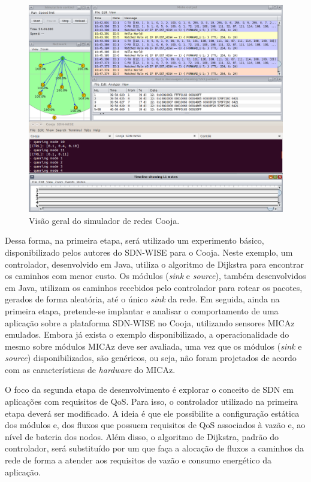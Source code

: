 \begin{figure}[!htb]
    \centering
    \includegraphics[width=15cm]{figs/simuladorCooja.png}
    \caption{Visão geral do simulador de redes Cooja.}
    \label{simuladorCooja}
\end{figure}

Dessa forma, na primeira etapa, será utilizado um experimento básico, disponibilizado pelos autores do \ac{SDN-WISE} para o Cooja. Neste exemplo, um controlador, desenvolvido em Java, utiliza o algoritmo de Dijkstra para encontrar os caminhos com menor custo. Os módulos (\textit{sink} e \textit{source}), também desenvolvidos em Java, utilizam os caminhos recebidos pelo controlador para rotear os pacotes, gerados de forma aleatória, até o único \textit{sink} da rede. Em seguida, ainda na primeira etapa, pretende-se implantar e analisar o comportamento de uma aplicação sobre a plataforma \ac{SDN-WISE} no Cooja, utilizando sensores MICAz emulados. Embora já exista o exemplo disponibilizado, a operacionalidade do mesmo sobre módulos MICAz deve ser avaliada, uma vez que os módulos (\textit{sink} e \textit{source}) disponibilizados, são genéricos, ou seja, não foram projetados de acordo com as características de \textit{hardware} do MICAz. 

O foco da segunda etapa de desenvolvimento é explorar o conceito de \ac{SDN} em aplicações com requisitos de \ac{QoS}. Para isso, o controlador utilizado na primeira etapa deverá ser modificado. A ideia é que ele possibilite a configuração estática dos módulos e, dos fluxos que possuem requisitos de \ac{QoS} associados à vazão e, ao nível de bateria dos nodos. Além disso, o algoritmo de Dijkstra, padrão do controlador, será substituído por um que faça a alocação de fluxos a caminhos da rede de forma a atender aos requisitos de vazão e consumo energético da aplicação. 

